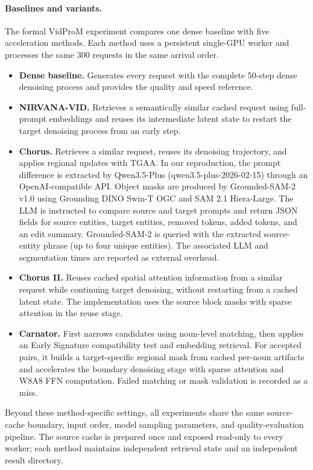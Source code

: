 \paragraph{Baselines and variants.}
The formal VidProM experiment compares one dense baseline with five acceleration
methods. Each method uses a persistent single-GPU worker and processes the same
300 requests in the same arrival order.

\begin{itemize}
  \item \textbf{Dense baseline.} Generates every request with the complete
  50-step dense denoising process and provides the quality and speed reference.
  \item \textbf{NIRVANA-VID.} Retrieves a semantically similar cached request
  using full-prompt embeddings and reuses its intermediate latent state to
  restart the target denoising process from an early step.
  \item \textbf{Chorus.} Retrieves a similar request, reuses its denoising
  trajectory, and applies regional updates with TGAA. In our reproduction, the
  prompt difference is extracted by Qwen3.5-Plus (qwen3.5-plus-2026-02-15) through an OpenAI-compatible API. Object masks are produced by Grounded-SAM-2 v1.0 using Grounding DINO Swin-T OGC and SAM 2.1 Hiera-Large. The LLM is instructed to compare source and target prompts and
  return JSON fields for source entities, target entities, removed tokens, added tokens, and an edit summary. Grounded-SAM-2 is queried with the extracted source-entity phrase (up to four unique entities). The associated LLM and segmentation times are reported as external overhead.
  \item \textbf{Chorus II.} Reuses cached spatial attention information from a
  similar request while continuing target denoising, without restarting from a
  cached latent state. The implementation uses the source block masks with
  sparse attention in the reuse stage.
  \item \textbf{Carnator.} First narrows candidates using noun-level matching,
  then applies an Early Signature compatibility test and embedding retrieval.
  For accepted pairs, it builds a target-specific regional mask from cached
  per-noun artifacts and accelerates the boundary denoising stage with sparse
  attention and W8A8 FFN computation. Failed matching or mask validation is
  recorded as a miss.
\end{itemize}

Beyond these method-specific settings, all experiments share the same source-cache
boundary, input order, model sampling parameters, and quality-evaluation
pipeline. The source cache is prepared once and exposed read-only to every
worker; each method maintains independent retrieval state and an independent
result directory.




